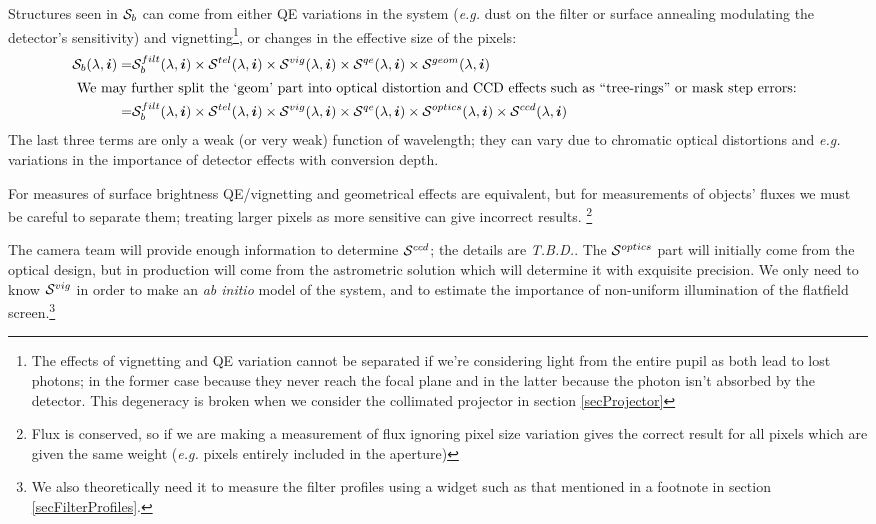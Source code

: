 \documentclass[12pt]{article}
\newcommand{\eg}{\textit{e.g.}\xspace}
\newcommand{\ib}{{\boldsymbol i}}
\newcommand{\qe}{{\cal S}}
\newcommand{\TBD}{\textit{T.B.D.}\xspace}
\begin{document}
Structures seen in $\qe_b$ can come from either QE variations in the system (\eg dust on the filter or surface
annealing modulating the detector's sensitivity) and vignetting\footnote{
  The effects of vignetting and QE variation cannot be separated if we're considering light from the
  entire pupil as both lead to
lost photons; in the former case because they never reach the focal plane and in the latter because
the photon isn't absorbed by the detector.  This degeneracy is broken when we consider the collimated projector
in section \ref{secProjector}}, or changes in the effective size of the
pixels:
\begin{align*}
\qe_b(\lambda, \ib) =& \qe_b^{filt}(\lambda, \ib) \times \qe^{tel}(\lambda, \ib) \times \qe^{vig}(\lambda, \ib)
\times \qe^{qe}(\lambda, \ib) \times \qe^{geom}(\lambda, \ib)\\
\intertext{
  We may further split the `geom' part into optical distortion and CCD effects such as
  ``tree-rings'' or mask step errors:
  }
=&                     \qe_b^{filt}(\lambda, \ib) \times
                       \qe^{tel}(\lambda, \ib) \times
                       \qe^{vig}(\lambda, \ib) \times
                       \qe^{qe}(\lambda, \ib) \times
                       \qe^{optics}(\lambda, \ib) \times
                       \qe^{ccd}(\lambda, \ib)
\end{align*}
The last three terms are only a weak (or very weak) function of wavelength; they can vary due to chromatic
optical distortions and \eg variations in the importance of detector effects with conversion depth.

For measures of surface brightness QE/vignetting and geometrical effects are equivalent, but for measurements of objects'
fluxes we must be careful to separate them; treating larger pixels as more sensitive can give incorrect
results.%
\footnote{Flux is conserved, so if we are making a measurement of flux ignoring pixel size
  variation gives the correct result for all pixels which are given the same weight (\eg pixels entirely included in the aperture)}

The camera team will provide enough information to determine $\qe^{ccd}$; the details are \TBD.  The
$\qe^{optics}$ part will initially come from the optical design, but in production will come from the
astrometric solution which will determine it with exquisite precision.  We only need to know $\qe^{vig}$ in
order to make an \textit{ab initio} model of the system, and to estimate the importance of non-uniform
illumination of the flatfield screen.\footnote{
  We also theoretically need it to measure the filter profiles using a widget such as that
  mentioned in a footnote in section \ref{secFilterProfiles}.
  }
\end{document}
